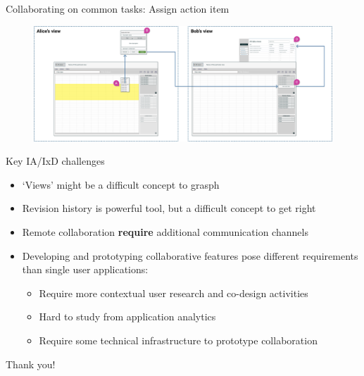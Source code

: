 \documentclass[aspectratio=169]{beamer}
\makeatletter
\newenvironment{restoretext}%
    {\@parboxrestore%
     \begin{adjustwidth}{-8mm}{-8mm}%
                \begin{lrbox}{\restorebox}%
                \begin{minipage}{\linewidth}%
    }{\end{minipage}\end{lrbox}
        \usebox\restorebox
        \end{adjustwidth}
     }
\makeatother
\begin{document}
\begin{frame}{Collaborating on common tasks: Assign action item}
    \vspace{2em}
    \begin{restoretext}
    \begin{figure}[h]
        \centering
        \includegraphics[width=1\textwidth]{images/assign-action-item.png}
    \end{figure}
\end{restoretext}
\end{frame}

\begin{frame}{Key IA/IxD challenges}
    \setlength\itemsep{10em}
    \begin{itemize}
        \item `Views' might be a difficult concept to grasph 
        \item Revision history is powerful tool, but a difficult concept to get right 
        \item Remote collaboration \textbf{require} additional communication channels
        \item Developing and prototyping collaborative features pose different requirements than single user applications:
        \begin{itemize}
            \footnotesize
            \vspace{0.3em}
            \item Require more contextual user research and co-design activities
            \vspace{0.1em}
            \item Hard to study from application analytics
            \vspace{0.1em}
            \item Require some technical infrastructure to prototype collaboration
        \end{itemize}
    \end{itemize}
\end{frame}

\begin{frame}[DarkSlide]{}
    \centering
    \Large Thank you!\\
\end{frame}
\end{document}
